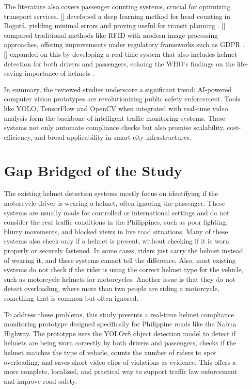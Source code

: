 \begin{refsection}
The literature also covers passenger counting systems, crucial for optimizing transport services. \citeauthor{rendon2023passenger} [\citeyear{rendon2023passenger}] developed a deep learning method for head counting in Bogotá, yielding minimal errors and proving useful for transit planning \cite{rendon2023passenger}. \citeauthor{radovan2024passenger} [\citeyear{radovan2024passenger}] compared traditional methods like RFID with modern image processing approaches, offering improvements under regulatory frameworks such as GDPR \cite{radovan2024passenger}. \citeauthor{bhatt2024ai} [\citeyear{bhatt2024ai}] expanded on this by developing a real-time system that also includes helmet detection for both drivers and passengers, echoing the WHO’s findings on the life-saving importance of helmets \cite{bhatt2024ai}.

In summary, the reviewed studies underscore a significant trend: AI-powered computer vision prototypes are revolutionizing public safety enforcement. Tools like YOLO, TensorFlow and OpenCV when integrated with real-time video analysis form the backbone of intelligent traffic monitoring systems. These systems not only automate compliance checks but also promise scalability, cost-efficiency, and broad applicability in smart city infrastructures.

\section{Gap Bridged of the Study}
 The existing helmet detection systems mostly focus on identifying if the motorcycle driver is wearing a helmet, often ignoring the passenger. These systems are usually made for controlled or international settings and do not consider the real traffic conditions in the Philippines, such as poor lighting, blurry movements, and blocked views in live road situations. Many of these systems also check only if a helmet is present, without checking if it is worn properly or securely fastened. In some cases, riders just carry the helmet instead of wearing it, and these systems cannot tell the difference. Also, most existing systems do not check if the rider is using the correct helmet type for the vehicle, such as motorcycle helmets for motorcycles. Another issue is that they do not detect overloading, where more than two people are riding a motorcycle, something that is common but often ignored.

 To address these problems, this study presents a real-time helmet compliance monitoring prototype designed specifically for Philippine roads like the Nabua Highway. The prototype uses the YOLOv8 object detection model to detect if helmets are being worn correctly by both drivers and passengers, checks if the helmet matches the type of vehicle, counts the number of riders to spot overloading, and saves short video clips of violations as evidence. This offers a more complete, localized, and practical way to support traffic law enforcement and improve road safety.



\clearpage

\printbibliography[heading=subbibintoc, title={\texorpdfstring{\centering}{} Notes}]
\end{refsection}